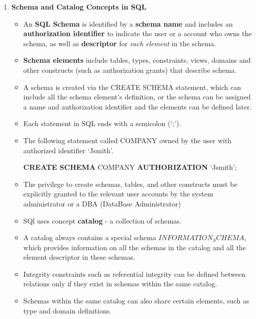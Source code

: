 \documentclass[10pt]{article}
\newcommand{\tf}{\textbf}
\newcommand{\ti}{\textit}
\begin{document}
\begin{enumerate}
	\item \tf{Schema and Catalog Concepts in SQL}
	\begin{itemize}
		\item An \tf{SQL Schema} is identified by a \tf{schema name} and includes an \tf{authorization identifier} to indicate the user or a account who owns the schema, as well as \tf{descriptor} for \ti{each element} in the schema.
		\item \tf{Schema elements} include tables, types, constraints, views, domains and other constructs (such as authorization grants) that describe schema.
		\item A schema is created via the CREATE SCHEMA statement, which can include all the schema element's definition, or the schema can be assigned a name and authorization identifier and the elements can be defined later.
		\item Each statement in SQL ends with a semicolon (`;').
		\item The following statement called COMPANY owned by the user with authorized identifier `Jsmith'.
		\begin{center}
			\tf{CREATE SCHEMA} COMPANY \tf{AUTHORIZATION} `Jsmith';
		\end{center}
		\item The privilege to create schemas, tables, and other constructs must be explicitly granted to the relevant user accounts by the system administrator or a DBA (DataBase Administrator)
		\item SQl uses concept \tf{catalog} - a collection of schemas.
		\item A catalog always contains a special schema $INFORMATION_SCHEMA$, which provides information on all the schemas in the catalog and all the element descriptor in these schemas.
		\item Integrity constraints such as referential integrity can be defined between relations only if they exist in schemas within the same catalog.
		\item Schemas within the same catalog can also share certain elements, such as type and domain definitions.
	\end{itemize}


\end{enumerate}
\end{document}
